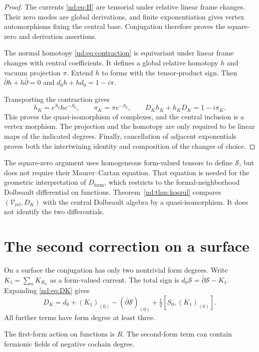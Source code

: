 \begin{proof}
The currents \eqref{nd:eq:H} are tensorial under relative linear
frame changes. Their zero modes are global derivations, and finite
exponentiation gives vertex automorphisms fixing the central base.
Conjugation therefore proves the square-zero and derivation assertions.

The normal homotopy \eqref{nd:eq:contraction} is equivariant under
linear frame changes with central coefficients. It defines a global
relative homotopy $h$ and vacuum projection $\pi$. Extend $h$ to
forms with the tensor-product sign. Then
$\bar\partial h+h\bar\partial=0$ and
$d_0h+hd_0=1-i\pi$.

Transporting the contraction gives
\[
 h_K=e^{S_0}he^{-S_0},\qquad
 \pi_K=\pi e^{-S_0},\qquad
 D_Kh_K+h_KD_K=1-i\pi_K.
\]
This proves the quasi-isomorphism of complexes, and the central
inclusion is a vertex morphism. The projection and the homotopy are
only required to be linear maps of the indicated degrees.
Finally, cancellation of adjacent exponentials proves both the
intertwining identity and composition of the changes of choice.
\end{proof}

The square-zero argument uses homogeneous form-valued tensors to
define $\mathscr S$, but does not require their Maurer--Cartan equation.
That equation is needed for the geometric interpretation of
$D_{\mathrm{form}}$, which restricts to the formal-neighborhood
Dolbeault differential on functions. Theorem~\ref{nd:thm:koszul}
compares $(\mathcal V_{\mathrm{rel}},D_K)$ with the central Dolbeault
algebra by a quasi-isomorphism. It does not identify the two differentials.

\section{The second correction on a surface}
\label{nd:sec:surface}

On a surface the conjugation has only two nontrivial form degrees.
Write $K_1=\sum_nK_{R_n}$ as a form-valued current. The total sign is
$d_0\mathscr S=\bar\partial\mathscr S-K_1$.
Expanding \eqref{nd:eq:DK} gives
\begin{equation}\label{nd:eq:surface}
 D_K=d_0+(K_1)_{(0)}-(\bar\partial\mathscr S)_{(0)}
                    +\tfrac12[S_0,(K_1)_{(0)}].
\end{equation}
All further terms have form degree at least three.

The first-form action on functions is $R$. The second-form term
can contain fermionic fields of negative cochain degree.

